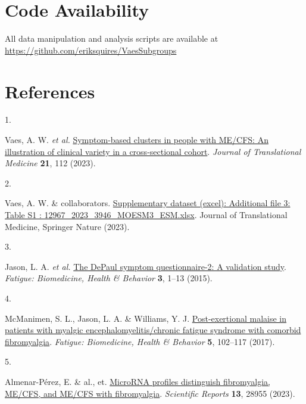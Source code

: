 \documentclass[
  letterpaper,
  DIV=11,
  numbers=noendperiod]{scrartcl}
\newlength{\cslhangindent}
\newlength{\csllabelwidth}
\newenvironment{CSLReferences}[2] %
 {\begin{list}{}{%
  \setlength{\itemindent}{0pt}
  \setlength{\leftmargin}{0pt}
  \setlength{\parsep}{0pt}
  \ifodd #1
   \setlength{\leftmargin}{\cslhangindent}
   \setlength{\itemindent}{-1\cslhangindent}
  \fi
  \setlength{\itemsep}{#2\baselineskip}}}
 {\end{list}}
\newcommand{\CSLLeftMargin}[1]{\parbox[t]{\csllabelwidth}{\strut#1\strut}}
\newcommand{\CSLRightInline}[1]{\parbox[t]{\linewidth - \csllabelwidth}{\strut#1\strut}}
\begin{document}
\FloatBarrier

\section*{Code Availability}\label{sec-code}

All data manipulation and analysis scripts are available at
\url{https://github.com/eriksquires/VaesSubgroups}

\section*{References}\label{references}

\label{refs}
\begin{CSLReferences}{0}{0}
\CSLLeftMargin{1. }%
\CSLRightInline{Vaes, A. W. \emph{et al.}
\href{https://doi.org/10.1186/s12967-023-03946-6}{Symptom-based clusters
in people with ME/CFS: An illustration of clinical variety in a
cross-sectional cohort}. \emph{Journal of Translational Medicine}
\textbf{21}, 112 (2023).}

\CSLLeftMargin{2. }%
\CSLRightInline{Vaes, A. W. \& collaborators.
\href{https://static-content.springer.com/esm/art\%3A10.1186\%2Fs12967-023-03946-6/MediaObjects/12967_2023_3946_MOESM3_ESM.xlsx}{Supplementary
dataset (excel): Additional file 3: Table S1 :
12967\_2023\_3946\_MOESM3\_ESM.xlsx}. Journal of Translational Medicine,
Springer Nature (2023).}

\CSLLeftMargin{3. }%
\CSLRightInline{Jason, L. A. \emph{et al.}
\href{https://doi.org/10.1080/21641846.2014.978110}{The DePaul symptom
questionnaire-2: A validation study}. \emph{Fatigue: Biomedicine, Health
\& Behavior} \textbf{3}, 1--13 (2015).}

\CSLLeftMargin{4. }%
\CSLRightInline{McManimen, S. L., Jason, L. A. \& Williams, Y. J.
\href{https://doi.org/10.1080/21641846.2017.1281323}{Post-exertional
malaise in patients with myalgic encephalomyelitis/chronic fatigue
syndrome with comorbid fibromyalgia}. \emph{Fatigue: Biomedicine, Health
\& Behavior} \textbf{5}, 102--117 (2017).}

\CSLLeftMargin{5. }%
\CSLRightInline{Almenar-Pérez, E. \& al., et.
\href{https://doi.org/10.1038/s41598-023-28955-9}{MicroRNA profiles
distinguish fibromyalgia, ME/CFS, and ME/CFS with fibromyalgia}.
\emph{Scientific Reports} \textbf{13}, 28955 (2023).}

\end{CSLReferences}
\end{document}
